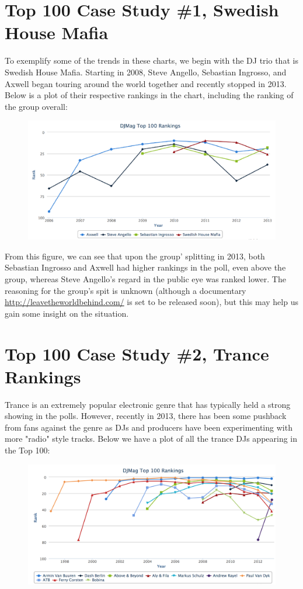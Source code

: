 \documentclass[12pt]{dalcsthesis}
\begin{document}
\section{Top 100 Case Study \#1, Swedish House Mafia}

To exemplify some of the trends in these charts, we begin with the DJ trio that is Swedish House Mafia. Starting in 2008, Steve Angello, Sebastian Ingrosso, and Axwell began touring around the world together and recently stopped in 2013. Below is a plot of their respective rankings in the chart, including the ranking of the group overall: 

\begin{figure}[h]
\includegraphics[scale=.65]{shm_graph}
\centering
\end{figure}

From this figure, we can see that upon the group' splitting in 2013, both Sebastian Ingrosso and Axwell had higher rankings in the poll, even above the group, whereas Steve Angello's regard in the public eye was ranked lower. The reasoning for the group's spit is unknown (although a documentary \url{http://leavetheworldbehind.com/} is set to be released soon), but this may help us gain some insight on the situation.

\section{Top 100 Case Study \#2, Trance Rankings}

Trance is an extremely popular electronic genre that has typically held a strong showing in the polls. However, recently in 2013, there has been some pushback from fans against the genre as DJs and producers have been experimenting with more "radio" style tracks. Below we have a plot of all the trance DJs appearing in the Top 100:

\begin{figure}[h]
\includegraphics[scale=.4]{trance_graph}
\centering
\end{figure}
\end{document}
